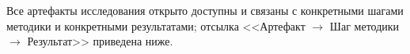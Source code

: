 \documentclass[a4paper, 12pt, oneside, openany]{article}
\begin{document}

\nocite{*}  %




\newpage

\appendix %
\renewcommand{\thesection}{Приложение \Asbuk{section}}
\section{\centering}\label{PrilA}
\begin{center} 
\end{center}
\setcounter{equation}{0} %
\renewcommand{\theequation}{\Asbuk{section}.\arabic{equation}} %
\setcounter{table}{0} %
\renewcommand{\thetable}{\Asbuk{section}.\arabic{table}} %
\setcounter{figure}{0} %
\renewcommand{\thefigure}{\Asbuk{section}.\arabic{figure}} %

Все артефакты исследования открыто доступны и связаны с конкретными шагами методики и конкретными результатами; отсылка <<Артефакт $\to$ Шаг методики $\to$ Результат>> приведена ниже.
\end{document}
